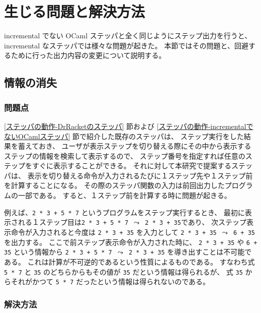 \section{生じる問題と解決方法}
\label{生じる問題と解決方法}

incremental でない OCaml ステッパと全く同じようにステップ出力を行うと、
incremental なステッパでは様々な問題が起きた。
本節ではその問題と、回避するために行った出力内容の変更について説明する。

\subsection{情報の消失}
\label{生じる問題と解決方法-情報の消失}

\subsubsection{問題点}
\label{生じる問題と解決方法-情報の消失-問題点}
\ref{ステッパの動作-DrRacketのステッパ} 節および
\ref{ステッパの動作-incrementalでないOCamlステッパ} 節で紹介した既存のステッパは、
ステップ実行をした結果を蓄えておき、
ユーザが表示ステップを切り替える際にその中から表示するステップの情報を検索して表示するので、
ステップ番号を指定すれば任意のステップをすぐに表示することができる。
それに対して本研究で提案するステッパは、
表示を切り替える命令が入力されるたびに１ステップ先や１ステップ前を計算することになる。
その際のステッパ関数の入力は前回出力したプログラムの一部である。
すると、１ステップ前を計算する時に問題が起きる。

例えば、\texttt{2 * 3 + 5 * 7} というプログラムをステップ実行するとき、
最初に表示される１ステップ目は\texttt{2 * 3 + 5 * 7 $\leadsto$ 2 * 3 + 35}であり、
次ステップ表示命令が入力されると今度は \texttt{2 * 3 + 35} を入力として
\texttt{2 * 3 + 35 $\leadsto$ 6 + 35} を出力する。
ここで前ステップ表示命令が入力された時に、
\texttt{2 * 3 + 35} や \texttt{6 + 35} という情報から
\texttt{2 * 3 + 5 * 7 $\leadsto$ 2 * 3 + 35} を導き出すことは不可能である。
これは計算が不可逆的であるという性質によるものである。
すなわち式 \texttt{5 * 7} と \texttt{35} のどちらからもその値が \texttt{35}
だという情報は得られるが、
式 \texttt{35} からそれがかつて \texttt{5 * 7} だったという情報は得られないのである。

\subsubsection{解決方法}
\label{生じる問題と解決方法-情報の消失-解決方法}

